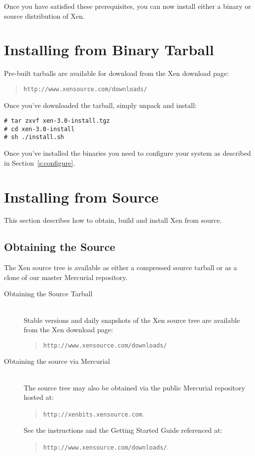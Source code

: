 Once you have satisfied these prerequisites, you can now install
either a binary or source distribution of Xen.


\section{Installing from Binary Tarball}

Pre-built tarballs are available for download from the Xen download
page:
\begin{quote} {\tt http://www.xensource.com/downloads/}
\end{quote}

Once you've downloaded the tarball, simply unpack and install:
\begin{verbatim}
# tar zxvf xen-3.0-install.tgz
# cd xen-3.0-install
# sh ./install.sh
\end{verbatim}

Once you've installed the binaries you need to configure your system
as described in Section~\ref{s:configure}.


\section{Installing from Source}

This section describes how to obtain, build and install Xen from
source.

\subsection{Obtaining the Source}

The Xen source tree is available as either a compressed source tarball
or as a clone of our master Mercurial repository.

\begin{description}
\item[Obtaining the Source Tarball]\mbox{} \\
  Stable versions and daily snapshots of the Xen source tree are
  available from the Xen download page:
  \begin{quote} {\tt \tt http://www.xensource.com/downloads/}
  \end{quote}
\item[Obtaining the source via Mercurial]\mbox{} \\
  The source tree may also be obtained via the public Mercurial
  repository hosted at:
  \begin{quote}{\tt http://xenbits.xensource.com}.
  \end{quote} See the instructions and the Getting Started Guide
  referenced at:
  \begin{quote}
    {\tt http://www.xensource.com/downloads/}.
  \end{quote}
\end{description}

